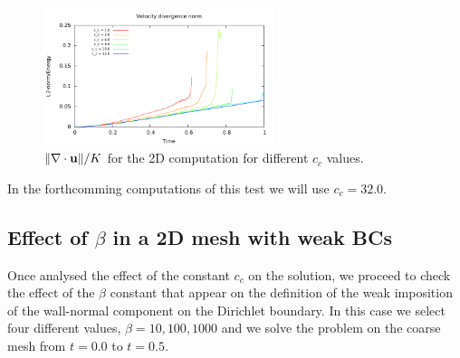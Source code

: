 \begin{figure}[h!]
  \centering
  \includegraphics[width=0.6\textwidth]{Figures/Chapter8/strong/divel}
  \caption{$\|\nabla\cdot{\bf u}\|/K$ for the 2D computation for different $ c_c $ values.}
  \label{fig-NACA_c_c_divel}
\end{figure}
In the forthcomming computations of this test we will use $ c_c=32.0 $.

\subsection{Effect of $ \beta $ in a 2D mesh with weak BCs}
Once analysed the effect of the constant $ c_c $ on the solution, we proceed to check the effect of the $ \beta $ constant that appear on the definition of the weak imposition of the wall-normal component on the Dirichlet boundary. In this case we select four different values, $ \beta={10,100,1000} $ and we solve the problem on the coarse mesh from $ t=0.0 $ to $ t=0.5 $.

